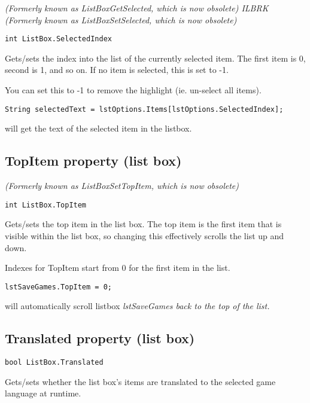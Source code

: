 \it{(Formerly known as ListBoxGetSelected, which is now obsolete)} ILBRK
\it{(Formerly known as ListBoxSetSelected, which is now obsolete)}

\begin{verbatim}
int ListBox.SelectedIndex
\end{verbatim}
Gets/sets the index into the list of the currently selected item. The first
item is 0, second is 1, and so on. If no item is selected, this is set to -1.

You can set this to -1 to remove the highlight (ie. un-select all items).

\begin{verbatim}
String selectedText = lstOptions.Items[lstOptions.SelectedIndex];
\end{verbatim}
will get the text of the selected item in the listbox.


\subsection{TopItem property (list box)}\label{ListBox.TopItem}%

\it{(Formerly known as ListBoxSetTopItem, which is now obsolete)}

\begin{verbatim}
int ListBox.TopItem
\end{verbatim}
Gets/sets the top item in the list box. The top item is the first item that is visible
within the list box, so changing this effectively scrolls the list up and down.

Indexes for TopItem start from 0 for the first item in the list.

\begin{verbatim}
lstSaveGames.TopItem = 0;
\end{verbatim}
will automatically scroll listbox \it{lstSaveGames} back to the top of the list.

\subsection{Translated property (list box)}\label{ListBox.Translated}%

\begin{verbatim}
bool ListBox.Translated
\end{verbatim}
Gets/sets whether the list box's items are translated to the selected game language at runtime.

